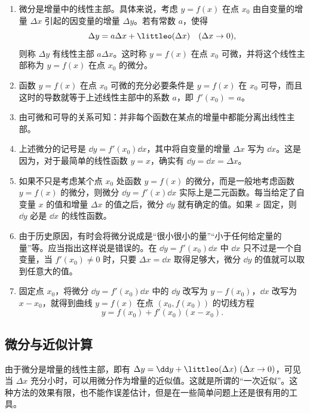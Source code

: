 \begin{enumerate}
  \item 微分是增量中的线性主部。具体来说，考虑 $y=f(x)$ 在点 $x_0$ 由自变量的增量 $\Delta x$ 引起的因变量的增量 $\Delta y$。若有常数 $a$，使得
  \[
    \Delta y=a\Delta x+\littleo(\Delta x)\quad(\Delta x\to0),
  \]
  则称 $\Delta y$ 有线性主部 $a\Delta x$。这时称 $y=f(x)$ 在点 $x_0$ 可微，并将这个线性主部称为 $y=f(x)$ 在点 $x_0$ 的微分。
  \item 函数 $y=f(x)$ 在点 $x_0$ 可微的充分必要条件是 $y=f(x)$ 在 $x_0$ 可导，而且这时的导数就等于上述线性主部中的系数 $a$，即 $f'(x_0)=a$。
  \item 由可微和可导的关系可知：并非每个函数在某点的增量中都能分离出线性主部。
  \item 上述微分的记号是 $\dd y=f'(x_0)\dd x$，其中将自变量的增量 $\Delta x$ 写为 $\dd x$。这是因为，对于最简单的线性函数 $y=x$，确实有 $\dd y=\dd x=\Delta x$。
  \item 如果不只是考虑某个点 $x_0$ 处函数 $y=f(x)$ 的微分，而是一般地考虑函数 $y=f(x)$ 的微分，则微分 $\dd y=f'(x)\dd x$ 实际上是二元函数。每当给定了自变量 $x$ 的值和增量 $\Delta x$ 的值之后，微分 $\dd y$ 就有确定的值。如果 $x$ 固定，则 $\dd y$ 必是 $\dd x$ 的线性函数。
  \item 由于历史原因，有时会将微分说成是“很小很小的量”“小于任何给定量的量”等。应当指出这样说是错误的。在 $\dd y=f'(x_0)\dd x$ 中 $\dd x$ 只不过是一个自变量，当 $f'(x_0)\ne0$ 时，只要 $\Delta x=\dd x$ 取得足够大，微分 $\dd y$ 的值就可以取到任意大的值。
  \item 固定点 $x_0$，将微分 $\dd y=f'(x_0)\dd x$ 中的 $\dd y$ 改写为 $y-f(x_0)$，$\dd x$ 改写为 $x-x_0$，就得到曲线 $y=f(x)$ 在点 $(x_0,f(x_0))$ 的切线方程
  \[
    y=f(x_0)+f'(x_0)(x-x_0).
  \]
\end{enumerate}

\subsection{微分与近似计算}

由于微分是增量的线性主部，即有 $\Delta y=\dd y+\littleo(\Delta x)\ (\Delta x\to0)$，可见当 $\Delta x$ 充分小时，可以用微分作为增量的近似值。这就是所谓的“一次近似”。这种方法的效果有限，也不能作误差估计，但是在一些简单问题上还是很有用的工具。

